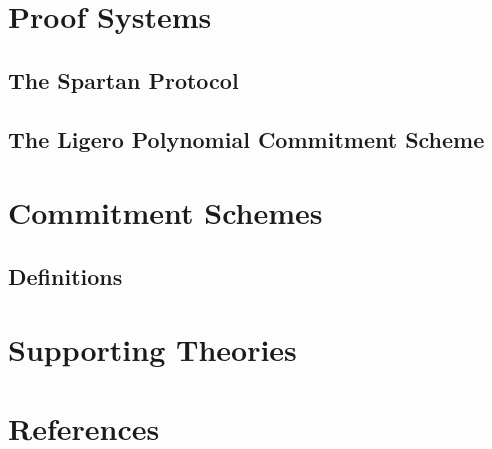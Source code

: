 

\chapter{Proof Systems}\label{chap:proof_systems}













\section{The Spartan Protocol}

\section{The Ligero Polynomial Commitment Scheme}

\chapter{Commitment Schemes}\label{chap:commitment_schemes}

\section{Definitions}





\chapter{Supporting Theories}\label{chap:supporting_theories}







\chapter{References}\label{chap:references}

